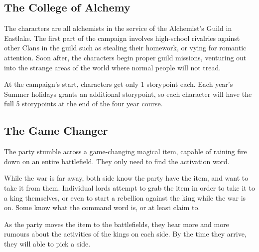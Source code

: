 {\begin{multicols}{2}
\subsection{The College of Alchemy}

The characters are all alchemists in the service of the Alchemist's Guild in Eastlake.
The first part of the campaign involves high-school rivalries against other Clans in the guild such as stealing their homework, or vying for romantic attention.
Soon after, the characters begin proper guild missions, venturing out into the strange areas of the world where normal people will not tread.

At the campaign's start, characters get only 1 \gls{storypoint} each.
Each year's Summer holidays grants an additional \gls{storypoint}, so each character will have the full 5 \glspl{storypoint} at the end of the four year course.

\subsection{The Game Changer}

The party stumble across a game-changing magical item, capable of raining fire down on an entire battlefield.
They only need to find the activation word.

While the war is far away, both side know the party have the item, and want to take it from them.
Individual lords attempt to grab the item in order to take it to a king themselves, or even to start a rebellion against the king while the war is on.
Some know what the command word is, or at least claim to.

As the party moves the item to the battlefields, they hear more and more rumours about the activities of the kings on each side.
By the time they arrive, they will able to pick a side.

\end{multicols}

}{}
